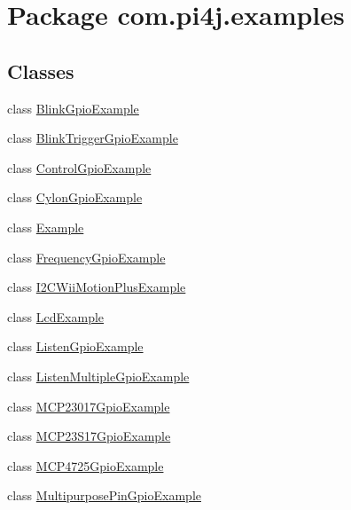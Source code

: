 \hypertarget{namespacecom_1_1pi4j_1_1examples}{}\section{Package com.\+pi4j.\+examples}
\label{namespacecom_1_1pi4j_1_1examples}
\subsection*{Classes}
\begin{DoxyCompactItemize}
\item 
class \hyperlink{classcom_1_1pi4j_1_1examples_1_1BlinkGpioExample}{Blink\+Gpio\+Example}
\item 
class \hyperlink{classcom_1_1pi4j_1_1examples_1_1BlinkTriggerGpioExample}{Blink\+Trigger\+Gpio\+Example}
\item 
class \hyperlink{classcom_1_1pi4j_1_1examples_1_1ControlGpioExample}{Control\+Gpio\+Example}
\item 
class \hyperlink{classcom_1_1pi4j_1_1examples_1_1CylonGpioExample}{Cylon\+Gpio\+Example}
\item 
class \hyperlink{classcom_1_1pi4j_1_1examples_1_1Example}{Example}
\item 
class \hyperlink{classcom_1_1pi4j_1_1examples_1_1FrequencyGpioExample}{Frequency\+Gpio\+Example}
\item 
class \hyperlink{classcom_1_1pi4j_1_1examples_1_1I2CWiiMotionPlusExample}{I2\+C\+Wii\+Motion\+Plus\+Example}
\item 
class \hyperlink{classcom_1_1pi4j_1_1examples_1_1LcdExample}{Lcd\+Example}
\item 
class \hyperlink{classcom_1_1pi4j_1_1examples_1_1ListenGpioExample}{Listen\+Gpio\+Example}
\item 
class \hyperlink{classcom_1_1pi4j_1_1examples_1_1ListenMultipleGpioExample}{Listen\+Multiple\+Gpio\+Example}
\item 
class \hyperlink{classcom_1_1pi4j_1_1examples_1_1MCP23017GpioExample}{M\+C\+P23017\+Gpio\+Example}
\item 
class \hyperlink{classcom_1_1pi4j_1_1examples_1_1MCP23S17GpioExample}{M\+C\+P23\+S17\+Gpio\+Example}
\item 
class \hyperlink{classcom_1_1pi4j_1_1examples_1_1MCP4725GpioExample}{M\+C\+P4725\+Gpio\+Example}
\item 
class \hyperlink{classcom_1_1pi4j_1_1examples_1_1MultipurposePinGpioExample}{Multipurpose\+Pin\+Gpio\+Example}
\item 

\end{DoxyCompactItemize}
